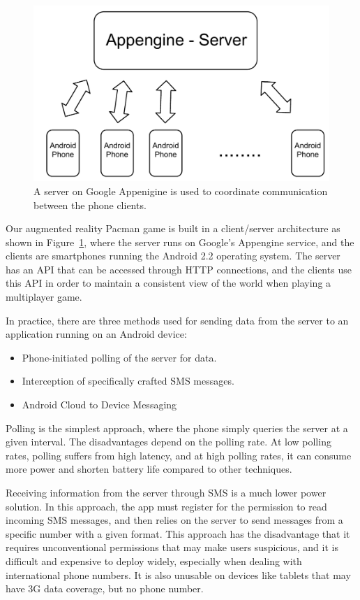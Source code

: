 \documentclass{acm_proc_article-sp}
\begin{document}
\begin{figure}
\centering
\includegraphics[scale=0.4]{figs/ServerArchitecture}
\caption{A server on Google Appenigine is used to coordinate communication between the phone clients.}
\label{fig:ServerArchitecture}
\end{figure}

Our augmented reality Pacman game is built in a client/server architecture as
shown in Figure~\ref{fig:ServerArchitecture}, where the server runs on Google's
Appengine service, and the clients are smartphones running the Android 2.2
operating system.  The server has an API that can be accessed through HTTP
connections, and the clients use this API in order to maintain a consistent
view of the world when playing a multiplayer game.

In practice, there are three methods used for sending data from the server to
an application running on an Android device:
\begin{itemize}
\item Phone-initiated polling of the server for data.
\item Interception of specifically crafted SMS messages.
\item Android Cloud to Device Messaging
\end{itemize}

Polling is the simplest approach, where the phone simply queries the server at
a given interval. The disadvantages depend on the polling rate. At low polling
rates, polling suffers from high latency, and at high polling rates, it can
consume more power and shorten battery life compared to other techniques.

Receiving information from the server through SMS is a much lower power
solution. In this approach, the app must register for the permission to read
incoming SMS messages, and then relies on the server to send messages from a
specific number with a given format. This approach has the disadvantage that it
requires unconventional permissions that may make users suspicious, and it is
difficult and expensive to deploy widely, especially when dealing with
international phone numbers. It is also unusable on devices like tablets that
may have 3G data coverage, but no phone number.
\end{document}
